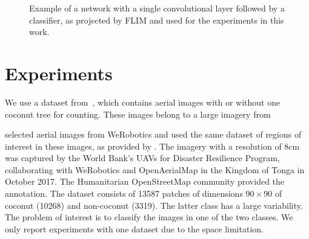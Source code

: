 \documentclass[a4paper,conference]{IEEEtran}
\begin{document}
\begin{figure}
  \begin{center}

  \end{center}
  \caption{Example of a network with a single convolutional layer followed by a classifier, as projected by FLIM and used for the experiments in this work.}
  \label{fig:tree}
\end{figure}

\section{Experiments}

We use a dataset from~\cite{8899005}, which contains aerial images with or without one coconut tree for counting. These images belong to a large imagery from  

selected aerial images from WeRobotics and used the same dataset of regions of interest in these images, as provided by\cite{8899005} . The imagery with a resolution of 8cm was captured by the World Bank's UAVs for Disaster Resilience Program, collaborating with WeRobotics and OpenAerialMap in the Kingdom of Tonga in October 2017. The Humanitarian OpenStreetMap community provided the annotation. The dataset consists of 13587 patches of dimensions $90 \times 90$ of coconut (10268) and non-coconut (3319). The latter class has a large variability. The problem of interest is to classify the images in one of the two classes. We only report experiments with one dataset due to the space limitation.
\end{document}
